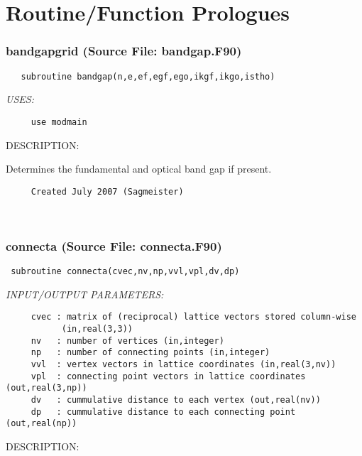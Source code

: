 \documentclass[11pt]{article}
\begin{document}
\tableofcontents
\newpage
\section{Routine/Function Prologues} \label{app:ProLogues}
\subsubsection{bandgapgrid (Source File: bandgap.F90)}


\begin{verbatim}   subroutine bandgap(n,e,ef,egf,ego,ikgf,ikgo,istho)\end{verbatim}{\em USES:}
\begin{verbatim}     use modmain\end{verbatim}
{\sf DESCRIPTION:\\ }


     Determines the fundamental and optical band gap if present.
  
\begin{verbatim}     Created July 2007 (Sagmeister)\end{verbatim}






 
 
\mbox{}\hrulefill\ 
 
\subsubsection{connecta (Source File: connecta.F90)}


\begin{verbatim} subroutine connecta(cvec,nv,np,vvl,vpl,dv,dp)\end{verbatim}{\em INPUT/OUTPUT PARAMETERS:}
\begin{verbatim}     cvec : matrix of (reciprocal) lattice vectors stored column-wise
           (in,real(3,3))
     nv   : number of vertices (in,integer)
     np   : number of connecting points (in,integer)
     vvl  : vertex vectors in lattice coordinates (in,real(3,nv))
     vpl  : connecting point vectors in lattice coordinates (out,real(3,np))
     dv   : cummulative distance to each vertex (out,real(nv))
     dp   : cummulative distance to each connecting point (out,real(np))\end{verbatim}
{\sf DESCRIPTION:\\ }
\end{document}
